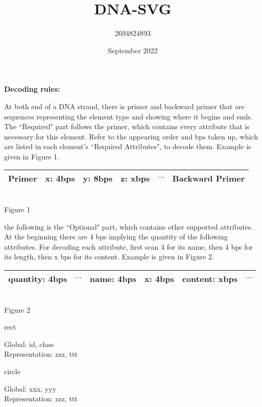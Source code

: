 \documentclass{article}
\title{DNA-SVG}
\author{2694824893 }
\date{September 2022}
\begin{document}
\maketitle
\noindent
{\fontsize{12pt}{14.4pt}\textbf{Decoding rules:}}
\par At both end of a DNA strand, there is primer and backward primer that are sequences representing the element type and showing where it begins and ends. The ``Required" part follows the primer, which contains every attribute that is necessary for this element. Refer to the appearing order and bps taken up, which are listed in each element's ``Required Attributes", to decode them. Example is given in Figure 1. 
\begin{center}
    \begin{tabular}{c|c|c|c|c|c}
        \hline 
        Primer & x: 4bps & y: 8bps & z: xbps & $\cdots$ & Backward Primer\\
        \hline
    \end{tabular}\\[4pt]
    Figure 1
\end{center}
\par the following is the ``Optional" part, which contains other supported attributes. At the beginning there are 4 bps implying the quantity of the following attributes. For decoding each attribute, first scan 4 for its name, then 4 bps for its length, then x bps for its content. Example is given in Figure 2.
\begin{center}
    \begin{tabular}{c|c|c|c|c|c}
        \hline 
        quantity: 4bps & $\cdots$ & name: 4bps & x: 4bps & content: xbps & $\cdots$ \\
        \hline
    \end{tabular}\\[4pt]
    Figure 2
\end{center}
\begin{Element}{rect}
    \begin{Required}
    \end{Required}
    \begin{Optional}
        Global: id, class\\
        Representation: zzz, ttt
    \end{Optional}
\end{Element}
\begin{Element}{circle}
    \begin{Required}
    \end{Required}
    \begin{Optional}
        Global: xxx, yyy\\
        Representation: zzz, ttt
    \end{Optional}
\end{Element}
\end{document}
